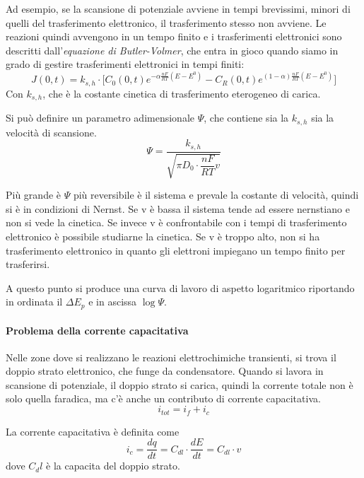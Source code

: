 Ad esempio, se la scansione di potenziale avviene in tempi brevissimi, minori di quelli del trasferimento elettronico, il trasferimento stesso non avviene.
Le reazioni quindi avvengono in un tempo finito e i trasferimenti elettronici sono descritti dall'\emph{equazione di Butler-Volmer}, che entra in gioco quando siamo in grado di gestire trasferimenti elettronici in tempi finiti:
\[
J (0,t) = k_{s,h} \cdot \biggl[C_0 (0,t) e^{- \alpha \frac{nF}{RT} (E- E^0)} - C_R (0,t) e^{(1-\alpha) \frac{nF}{RT} (E- E^0)} \biggr]
\]
Con $k_{s,h}$, che è la costante cinetica di trasferimento eterogeneo di carica.


Si può definire un parametro adimensionale $\Psi$, che contiene sia la $k_{s,h}$ sia la velocità di scansione.
\[
\Psi = \frac{k_{s,h}}{\sqrt{\pi D_0 \cdot \dfrac{nF}{RT} v}}
\]

Più grande è $\Psi$ più reversibile è il sistema e prevale la costante di velocità, quindi si è in condizioni di Nernst.
Se v è bassa il sistema tende ad essere nernstiano e non si vede la cinetica.
Se invece v è confrontabile con i tempi di trasferimento elettronico è possibile studiarne la cinetica.
Se v è troppo alto, non si ha trasferimento elettronico in quanto gli elettroni impiegano un tempo finito per trasferirsi.

A questo punto si produce una curva di lavoro di aspetto logaritmico riportando in ordinata il $\Delta E_p$ e in ascissa $\log \Psi$.


\paragraph{Problema della corrente capacitativa}
Nelle zone dove si realizzano le reazioni elettrochimiche transienti, si trova il doppio strato elettronico, che funge da condensatore.
Quando si lavora in scansione di potenziale, il doppio strato si carica, quindi la corrente totale non è solo quella faradica, ma c'è anche un contributo di corrente capacitativa.
\[
i_{tot} = i_f + i_c
\]

La corrente capacitativa è definita come
\[
i_c = \frac{dq}{dt} = C_{dl} \cdot \frac{dE}{dt} = C_{dl} \cdot v
\]
dove $C_dl$ è la capacita del doppio strato.


